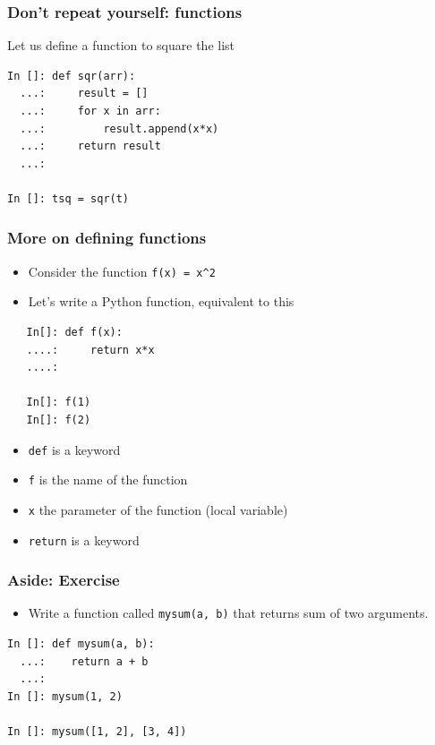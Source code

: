 \documentclass[14pt,compress]{beamer}
\newcommand{\typ}[1]{\lstinline{#1}}
\begin{document}
\begin{frame}[fragile]
\frametitle{Don't repeat yourself: functions}
\noindent Let us define a function to square the list
\begin{lstlisting}
In []: def sqr(arr):
  ...:     result = []
  ...:     for x in arr:
  ...:         result.append(x*x)
  ...:     return result
  ...:

In []: tsq = sqr(t)

\end{lstlisting}  %
\end{frame}

\begin{frame}[fragile]
  \frametitle{More on defining functions}
  \begin{itemize}
  \item Consider the function \texttt{f(x) = x\textasciicircum{}2}
  \item Let's write a Python function, equivalent to this
  \end{itemize}
  \begin{lstlisting}
   In[]: def f(x):
   ....:     return x*x
   ....:

   In[]: f(1)
   In[]: f(2)
  \end{lstlisting}
  \begin{itemize}
  \item \texttt{def} is a keyword
  \item \texttt{f} is the name of the function
  \item \texttt{x} the parameter of the function (local variable)
  \item \texttt{return} is a keyword
  \end{itemize}
\end{frame}

\begin{frame}[fragile]
  \frametitle{Aside: Exercise}
  \begin{itemize}
  \item Write a function called \typ{mysum(a, b)} that returns sum of two
    arguments.
  \end{itemize}
  \pause
\begin{lstlisting}
In []: def mysum(a, b):
  ...:    return a + b
  ...:
In []: mysum(1, 2)

In []: mysum([1, 2], [3, 4])
\end{lstlisting}
\end{frame}
\end{document}
